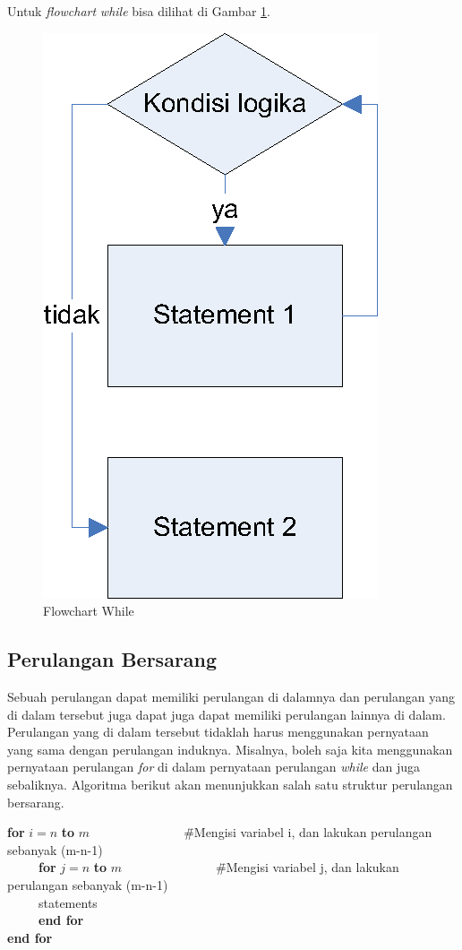 Untuk \textit{flowchart} \textit{while} bisa dilihat di Gambar \ref{fig:flowchartWhile}.
\begin{figure}%
\centering
\includegraphics[scale=0.6]{fig/flowchart-WHILE.eps}%
\caption{Flowchart While}%
\label{fig:flowchartWhile}%
\end{figure}


\FloatBarrier
\subsection{Perulangan Bersarang}
Sebuah perulangan dapat memiliki perulangan di dalamnya dan perulangan yang di dalam tersebut juga dapat juga dapat memiliki perulangan lainnya di dalam. Perulangan yang di dalam tersebut tidaklah harus menggunakan pernyataan yang sama dengan perulangan induknya. Misalnya, boleh saja kita menggunakan pernyataan perulangan \textit{for} di dalam pernyataan perulangan \textit{while} dan juga sebaliknya. Algoritma berikut akan menunjukkan salah satu struktur perulangan bersarang.

\begin{tabbing}
\textbf{for} $i=n$ \textbf{to} $m$~~~~~~~~~~~~~~~\=\#Mengisi variabel i, dan lakukan perulangan sebanyak (m-n-1)\\
~~~~~\textbf{for} $j=n$ \textbf{to} $m$~~~~~~~~~~~~~~~\=\#Mengisi variabel j, dan lakukan perulangan sebanyak (m-n-1)\\
~~~~~statements\\
~~~~~\textbf{end for}\\
\textbf{end for}
\end{tabbing}






	
 
